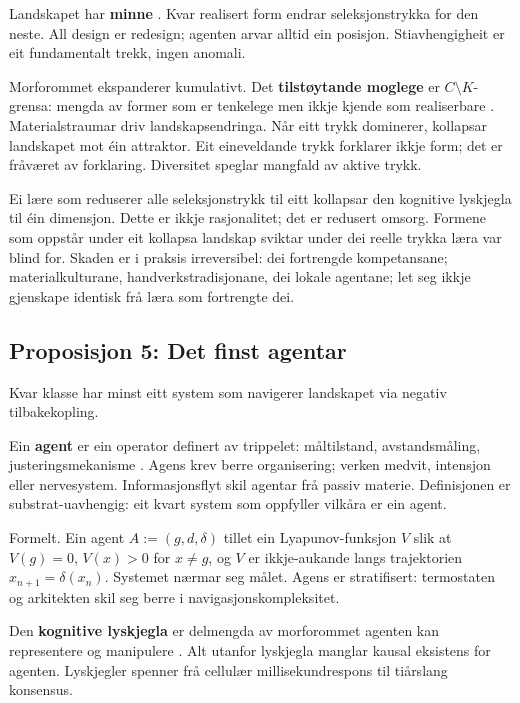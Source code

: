 Landskapet har \textbf{minne} \parencite{Arthur1994}. Kvar realisert form endrar seleksjonstrykka for den neste. All design er redesign; agenten arvar alltid ein posisjon. Stiavhengigheit er eit fundamentalt trekk, ingen anomali.

Morforommet ekspanderer kumulativt. Det \textbf{tilstøytande moglege} er $C \setminus K$-grensa: mengda av former som er tenkelege men ikkje kjende som realiserbare \parencite{Kauffman1993}. Materialstraumar driv landskapsendringa. Når eitt trykk dominerer, kollapsar landskapet mot éin attraktor. Eit eineveldande trykk forklarer ikkje form; det er fråværet av forklaring. Diversitet speglar mangfald av aktive trykk.

Ei lære som reduserer alle seleksjonstrykk til eitt kollapsar den kognitive lyskjegla til éin dimensjon. Dette er ikkje rasjonalitet; det er redusert omsorg. Formene som oppstår under eit kollapsa landskap sviktar under dei reelle trykka læra var blind for. Skaden er i praksis irreversibel: dei fortrengde kompetansane; materialkulturane, handverkstradisjonane, dei lokale agentane; let seg ikkje gjenskape identisk frå læra som fortrengte dei.

\subsection{Proposisjon 5: Det finst agentar}

Kvar klasse har minst eitt system som navigerer landskapet via negativ tilbakekopling.

Ein \textbf{agent} er ein operator definert av trippelet: måltilstand, avstandsmåling, justeringsmekanisme \parencite{Rosenblueth1943, Wiener1948, Ashby1956}. Agens krev berre organisering; verken medvit, intensjon eller nervesystem. Informasjonsflyt skil agentar frå passiv materie. Definisjonen er substrat-uavhengig: eit kvart system som oppfyller vilkåra er ein agent.

Formelt. Ein agent $A := (g, d, \delta)$ tillet ein Lyapunov-funksjon $V$ slik at $V(g) = 0$, $V(x) > 0$ for $x \neq g$, og $V$ er ikkje-aukande langs trajektorien $x_{n+1} = \delta(x_n)$. Systemet nærmar seg målet. Agens er stratifisert: termostaten og arkitekten skil seg berre i navigasjonskompleksitet.

Den \textbf{kognitive lyskjegla} er delmengda av morforommet agenten kan representere og manipulere \parencite{Fields2022}. Alt utanfor lyskjegla manglar kausal eksistens for agenten. Lyskjegler spenner frå cellulær millisekundrespons til tiårslang konsensus.

